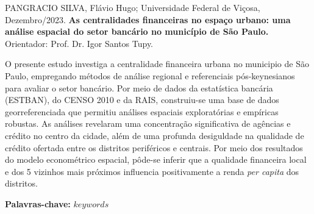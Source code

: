 \begin{spacing}{1.0}
\justify

\setlength{\parindent}{0pt}

PANGRACIO SILVA, Flávio Hugo; Universidade Federal de Viçosa, Dezembro/2023. \textbf{As centralidades financeiras no espaço urbano: uma análise espacial do setor bancário no município de São Paulo.} Orientador: Prof. Dr. Igor Santos Tupy.

O presente estudo investiga a centralidade financeira urbana no municipio de São Paulo, empregando métodos de análise regional e referenciais pós-keynesianos para avaliar o setor bancário. Por meio de dados da estatística bancária (ESTBAN), do CENSO 2010 e da RAIS, construiu-se uma base de dados georreferenciada que permitiu análises espaciais exploratórias e empíricas robustas. As análises revelaram uma concentração significativa de agências e crédito no centro da cidade, além de uma profunda desiguldade na qualidade de crédito ofertada entre os distritos periféricos e centrais. Por meio dos resultados do modelo econométrico espacial, pôde-se inferir que a qualidade financeira local e dos 5 vizinhos mais próximos influencia positivamente a renda \textit{per capita} dos distritos.

\textbf{Palavras-chave:} $keywords$

\setlength{\parindent}{15pt}

\end{spacing}

\newpage
\renewcommand{\listfigurename}{LISTA DE FIGURAS}
\pagestyle{fancy}
\listoffigures

\newpage
\renewcommand{\listtablename}{LISTA DE TABELAS}
\pagestyle{fancy}
\listoftables

\newpage
\renewcommand{\contentsname}{SUMÁRIO}
\pagestyle{fancy}
\tableofcontents

\newpage
{}

